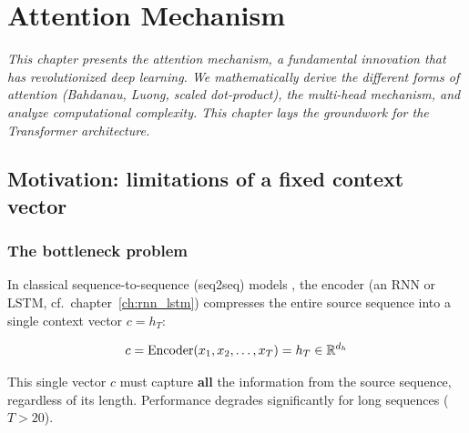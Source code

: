 \chapter{Attention Mechanism}
\label{ch:attention}

\noindent\textit{This chapter presents the attention mechanism, a fundamental innovation that
has revolutionized deep learning. We mathematically derive the different forms
of attention (Bahdanau, Luong, scaled dot-product), the multi-head mechanism,
and analyze computational complexity. This chapter lays the groundwork for the
Transformer architecture.}\medskip

\section{Motivation: limitations of a fixed context vector}
\label{sec:attention-motivation}

\subsection{The bottleneck problem}

In classical sequence-to-sequence (seq2seq) models
\cite{sutskever2014sequence}, the encoder (an RNN or LSTM, cf.\
chapter~\ref{ch:rnn_lstm}) compresses the entire source sequence into a
single context vector $c = h_T$:

\begin{equation}
c = \text{Encoder}(x_1, x_2, \ldots, x_T) = h_T \in \mathbb{R}^{d_h}
\end{equation}

\begin{warning}[title=\textbf{Information bottleneck}]
This single vector $c$ must capture \textbf{all} the information from the
source sequence, regardless of its length. Performance degrades
significantly for long sequences ($T > 20$).
\end{warning}

